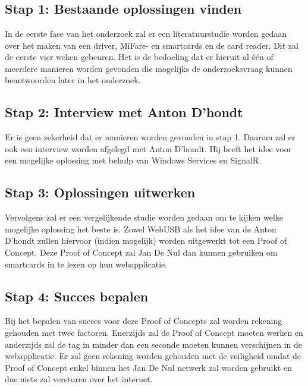 \graphicspath{{graphics/}}
\chapter{}%
\label{ch:methodologie}

\section{Stap 1: Bestaande oplossingen vinden}
In de eerste fase van het onderzoek zal er een literatuurstudie worden gedaan over het maken van een driver, MiFare- en smartcards en de card reader. Dit zal de eerste vier weken gebeuren. Het is de bedoeling dat er hieruit al één of meerdere manieren worden gevonden die mogelijks de onderzoeksvraag kunnen beantwoorden later in het onderzoek.

\section{Stap 2: Interview met Anton D'hondt}
Er is geen zekerheid dat er manieren worden gevonden in stap 1. Daarom zal er ook een interview worden afgelegd met Anton D'hondt. Hij heeft het idee voor een mogelijke oplossing met behulp van Windows Services en SignalR.

\section{Stap 3: Oplossingen uitwerken}
Vervolgens zal er een vergelijkende studie worden gedaan om te kijken welke mogelijke oplossing het beste is. Zowel WebUSB als het idee van de Anton D'hondt zullen hiervoor (indien mogelijk) worden uitgewerkt tot een Proof of Concept. Deze Proof of Concept zal Jan De Nul dan kunnen gebruiken om smartcards in te lezen op hun webapplicatie.

\section{Stap 4: Succes bepalen}
Bij het bepalen van succes voor deze Proof of Concepts zal worden rekening gehouden met twee factoren. Enerzijds zal de Proof of Concept moeten werken en anderzijds zal de tag in minder dan een seconde moeten kunnen verschijnen in de webapplicatie. Er zal geen rekening worden gehouden met de veiligheid omdat de Proof of Concept enkel binnen het Jan De Nul netwerk zal worden gebruikt en dus niets zal versturen over het internet.


